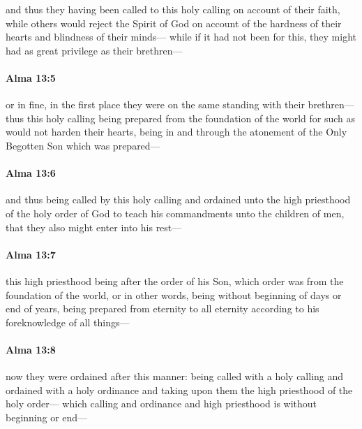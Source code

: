 			and thus they having been called to this holy calling on account of their faith,
			while others would reject the Spirit of God
			on account of the hardness of their hearts and blindness of their minds---
			while if it had not been for this,
			they might had as great privilege as their brethren---

		\paragraph{Alma 13:5} %
			\label{ALMA-13-5}

			or in fine, in the first place they were on the same standing with their brethren---
			thus this holy calling being prepared from the foundation of the world
			for such as would not harden their hearts,
			being in and through the atonement of the Only Begotten Son which was prepared---

		\paragraph{Alma 13:6} %
			\label{ALMA-13-6}

			and thus being called by this holy calling
			and ordained unto the high priesthood of the holy order of God
			to teach his commandments unto the children of men,
			that they also might enter into his rest---

		\paragraph{Alma 13:7} %
			\label{ALMA-13-7}

			this high priesthood being after the order of his Son,
			which order was from the foundation of the world,
			or in other words, being without beginning of days or end of years,
			being prepared from eternity to all eternity
			according to his foreknowledge of all things---

		\paragraph{Alma 13:8} %
			\label{ALMA-13-8}

			now they were ordained after this manner:
			being called with a holy calling and ordained with a holy ordinance
			and taking upon them the high priesthood of the holy order---
			which calling and ordinance and high priesthood is without beginning or end---

